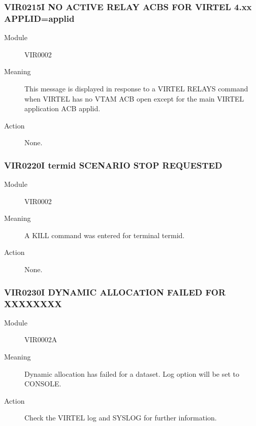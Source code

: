\documentclass[letterpaper,10pt,english]{sphinxmanual}
\begin{document}
\subsubsection{VIR0215I NO ACTIVE RELAY ACBS FOR VIRTEL 4.xx APPLID=applid}
\label{\detokenize{messages:vir0215i-no-active-relay-acbs-for-virtel-4-xx-applid-applid}}\begin{description}
\item[{Module}] \leavevmode
VIR0002

\item[{Meaning}] \leavevmode
This message is displayed in response to a VIRTEL RELAYS command when VIRTEL has no VTAM ACB open except for the main VIRTEL application ACB applid.

\item[{Action}] \leavevmode
None.

\end{description}


\subsubsection{VIR0220I termid SCENARIO STOP REQUESTED}
\label{\detokenize{messages:vir0220i-termid-scenario-stop-requested}}\begin{description}
\item[{Module}] \leavevmode
VIR0002

\item[{Meaning}] \leavevmode
A KILL command was entered for terminal termid.

\item[{Action}] \leavevmode
None.

\end{description}


\subsubsection{VIR0230I DYNAMIC ALLOCATION FAILED FOR XXXXXXXX}
\label{\detokenize{messages:vir0230i-dynamic-allocation-failed-for-xxxxxxxx}}\begin{description}
\item[{Module}] \leavevmode
VIR0002A

\item[{Meaning}] \leavevmode
Dynamic allocation has failed for a dataset. Log option will be set to CONSOLE.

\item[{Action}] \leavevmode
Check the VIRTEL log and SYSLOG for further information.

\end{description}
\end{document}
